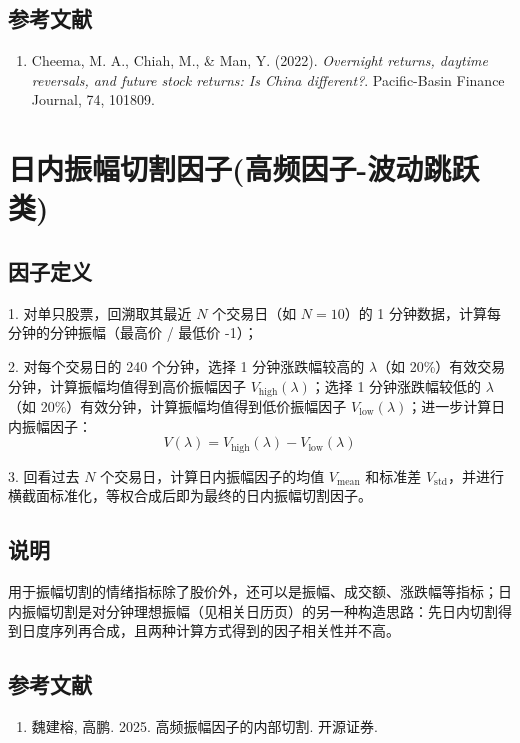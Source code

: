 \documentclass{article}
\begin{document}
\subsection{参考文献}
\begin{enumerate}
    \item Cheema, M. A., Chiah, M., \& Man, Y. (2022). \textit{Overnight returns, daytime reversals, and future stock returns: Is China different?}. Pacific-Basin Finance Journal, 74, 101809.
\end{enumerate}

\section{日内振幅切割因子(高频因子-波动跳跃类)}

\subsection{因子定义}


1. 对单只股票，回溯取其最近 \( N \) 个交易日（如 \( N=10 \)）的 1 分钟数据，计算每分钟的分钟振幅（最高价 / 最低价 -1）；

2. 对每个交易日的 240 个分钟，选择 1 分钟涨跌幅较高的 \( \lambda \)（如 20\%）有效交易分钟，计算振幅均值得到高价振幅因子 \( V_{\text{high}}(\lambda) \)；选择 1 分钟涨跌幅较低的 \( \lambda \)（如 20\%）有效分钟，计算振幅均值得到低价振幅因子 \( V_{\text{low}}(\lambda) \)；进一步计算日内振幅因子：
\begin{equation}
    V(\lambda) = V_{\text{high}}(\lambda) - V_{\text{low}}(\lambda)
\end{equation}

3. 回看过去 \( N \) 个交易日，计算日内振幅因子的均值 \( V_{\text{mean}} \) 和标准差 \( V_{\text{std}} \)，并进行横截面标准化，等权合成后即为最终的日内振幅切割因子。

\subsection{说明}
用于振幅切割的情绪指标除了股价外，还可以是振幅、成交额、涨跌幅等指标；日内振幅切割是对分钟理想振幅（见相关日历页）的另一种构造思路：先日内切割得到日度序列再合成，且两种计算方式得到的因子相关性并不高。

\subsection{参考文献}
\begin{enumerate}
    \item 魏建榕, 高鹏. 2025. 高频振幅因子的内部切割. 开源证券.
\end{enumerate}
\end{document}

